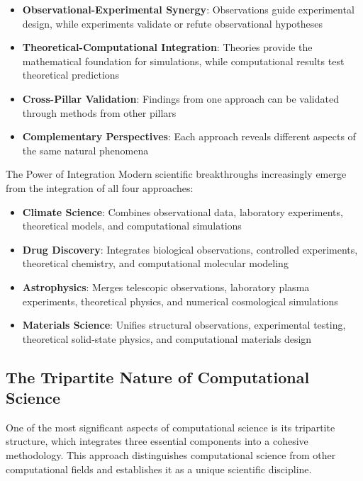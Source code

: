\begin{itemize}
    \item \textbf{Observational-Experimental Synergy}: Observations guide experimental design, while experiments validate or refute observational hypotheses
    \item \textbf{Theoretical-Computational Integration}: Theories provide the mathematical foundation for simulations, while computational results test theoretical predictions
    \item \textbf{Cross-Pillar Validation}: Findings from one approach can be validated through methods from other pillars
    \item \textbf{Complementary Perspectives}: Each approach reveals different aspects of the same natural phenomena
\end{itemize}

\begin{highlightbox}{The Power of Integration}
Modern scientific breakthroughs increasingly emerge from the integration of all four approaches:
\begin{itemize}
    \item \textbf{Climate Science}: Combines observational data, laboratory experiments, theoretical models, and computational simulations
    \item \textbf{Drug Discovery}: Integrates biological observations, controlled experiments, theoretical chemistry, and computational molecular modeling
    \item \textbf{Astrophysics}: Merges telescopic observations, laboratory plasma experiments, theoretical physics, and numerical cosmological simulations
    \item \textbf{Materials Science}: Unifies structural observations, experimental testing, theoretical solid-state physics, and computational materials design
\end{itemize}
\end{highlightbox}

\subsection{The Tripartite Nature of Computational Science}

One of the most significant aspects of computational science is its tripartite structure, which integrates three essential components into a cohesive methodology. This approach distinguishes computational science from other computational fields and establishes it as a unique scientific discipline.

